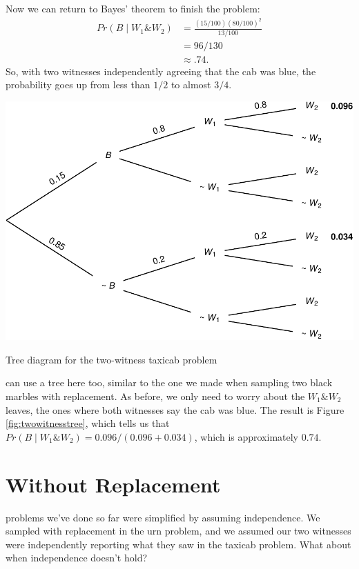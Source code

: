 \documentclass[justified]{tufte-book}
\newcommand{\given}{\mid}
\renewcommand{\wedge}{\mathbin{\&}}
\newcommand{\p}{Pr}
\theoremstyle{definition}
\theoremstyle{definition}
\theoremstyle{definition}
\theoremstyle{remark}
\begin{document}
Now we can return to Bayes' theorem to finish the problem: \[
  \begin{aligned}
    \p(B \given W_1 \wedge W_2) &= \frac{(15/100)(80/100)^2}{13/100}\\
                                &= 96/130\\
                                &\approx .74.
  \end{aligned}
\] So, with two witnesses independently agreeing that the cab was blue,
the probability goes up from less than \(1/2\) to almost \(3/4\).

\begin{marginfigure}
\includegraphics{_main_files/figure-latex/twowitnesstree-1} \caption[Tree diagram for the two-witness taxicab problem]{Tree diagram for the two-witness taxicab problem}\label{fig:twowitnesstree}
\end{marginfigure}

 can use a tree here too, similar to the one we made when
sampling two black marbles with replacement. As before, we only need to
worry about the \(W_1 \wedge W_2\) leaves, the ones where both witnesses
say the cab was blue. The result is Figure \ref{fig:twowitnesstree},
which tells us that
\(\p(B \given W_1 \wedge W_2) = 0.096 / (0.096 + 0.034)\), which is
approximately \(0.74\).

\hypertarget{without-replacement}{%
\section{Without Replacement}\label{without-replacement}}

 problems we've done so far were simplified by assuming
independence. We sampled with replacement in the urn problem, and we
assumed our two witnesses were independently reporting what they saw in
the taxicab problem. What about when independence doesn't hold?
\end{document}
